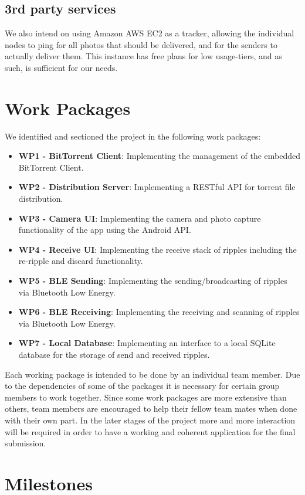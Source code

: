 \documentclass{report}
\begin{document}
\subsection{3rd party services}
We also intend on using Amazon AWS EC2  as a tracker, allowing the individual nodes to ping for all photos that should be delivered, and for the senders to actually deliver them.
This instance has free plans for low usage-tiers, and as such, is sufficient for our needs.

\section{Work Packages}
We identified and sectioned the project in the following work packages: 

\begin{itemize}
    \item {\bf WP1 - BitTorrent Client}: Implementing the management of the embedded BitTorrent Client.
    \item {\bf WP2 - Distribution Server}: Implementing a RESTful API for torrent file distribution.
    \item {\bf WP3 - Camera UI}: Implementing the camera and photo capture functionality of the app using the Android API.
    \item {\bf WP4 - Receive UI}: Implementing the receive stack of ripples including the re-ripple and discard functionality.
    \item {\bf WP5 - BLE Sending}: Implementing the sending/broadcasting of ripples via Bluetooth Low Energy.
    \item {\bf WP6 - BLE Receiving}: Implementing the receiving and scanning of ripples via Bluetooth Low Energy.
    \item {\bf WP7 - Local Database}: Implementing an interface to a local SQLite database for the storage of send and received ripples.
\end{itemize}

Each working package is intended to be done by an individual team member. Due to the dependencies of some of the packages it is necessary for certain group members to work together. Since some work packages are more extensive than others, team members are encouraged to help their fellow team mates when done with their own part. In the later stages of the project more and more interaction will be required in order to have a working and coherent application for the final submission. 
 
\section{Milestones}
\end{document}
